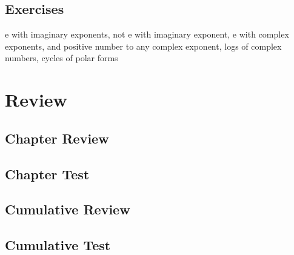 \subsection{Exercises}
e with imaginary exponents,  not e with imaginary exponent, 
e with complex exponents, and positive number to any complex exponent,
logs of complex numbers, cycles of polar forms




\newpage
\section{Review}
\subsection{Chapter Review}
\subsection{Chapter Test}
\subsection{Cumulative Review}
\subsection{Cumulative Test}


